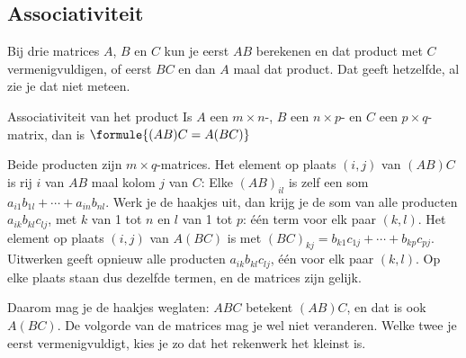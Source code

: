 \subsection{Associativiteit}

Bij drie matrices $A$, $B$ en $C$ kun je eerst $AB$ berekenen en dat product met $C$ vermenigvuldigen, of eerst $BC$ en dan $A$ maal dat product. Dat geeft hetzelfde, al zie je dat niet meteen.

\begin{theorie}
\begin{stelling}{Associativiteit van het product}
Is $A$ een $m \times n$-, $B$ een $n \times p$- en $C$ een $p \times q$-matrix, dan is \qquad $\formule{(AB)C = A(BC)}$
\end{stelling}

\begin{bewijs}
Beide producten zijn $m \times q$-matrices. Het element op plaats $(i, j)$ van $(AB)C$ is rij $i$ van $AB$ maal kolom $j$ van $C$:
Elke $(AB)_{il}$ is zelf een som $a_{i1}b_{1l} + \cdots + a_{in}b_{nl}$. Werk je de haakjes uit, dan krijg je de som van alle producten $a_{ik}b_{kl}c_{lj}$, met $k$ van 1 tot $n$ en $l$ van 1 tot $p$: één term voor elk paar $(k, l)$. Het element op plaats $(i, j)$ van $A(BC)$ is
met $(BC)_{kj} = b_{k1}c_{1j} + \cdots + b_{kp}c_{pj}$. Uitwerken geeft opnieuw alle producten $a_{ik}b_{kl}c_{lj}$, één voor elk paar $(k, l)$. Op elke plaats staan dus dezelfde termen, en de matrices zijn gelijk.
\end{bewijs}
\end{theorie}

Daarom mag je de haakjes weglaten: $ABC$ betekent $(AB)C$, en dat is ook $A(BC)$. De volgorde van de matrices mag je wel niet veranderen. Welke twee je eerst vermenigvuldigt, kies je zo dat het rekenwerk het kleinst is.

